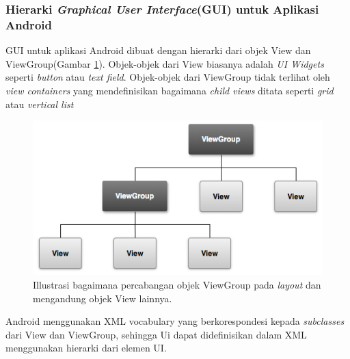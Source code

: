 \subsubsection{Hierarki \textit{Graphical User Interface}(GUI) untuk Aplikasi Android}
GUI untuk aplikasi Android dibuat dengan hierarki dari objek View dan ViewGroup(Gambar \ref{fig:viewgroup}). Objek-objek dari View biasanya adalah \textit{UI Widgets} seperti \textit{button} atau \textit{text field}. Objek-objek dari ViewGroup tidak terlihat oleh \textit{view containers} yang mendefinisikan bagaimana \textit{child views} ditata seperti \textit{grid} atau \textit{vertical list}
\begin{figure}[htbp]
	\centering
		\includegraphics[scale=1]{Gambar/viewgroup.png}
	\caption{Illustrasi bagaimana percabangan objek ViewGroup pada \textit{layout} dan mengandung objek View lainnya.}
	\label{fig:viewgroup}
\end{figure}
Android menggunakan XML vocabulary yang berkorespondesi kepada \textit{subclasses} dari View dan ViewGroup, sehingga Ui dapat didefinisikan dalam XML menggunakan hierarki dari elemen UI.
